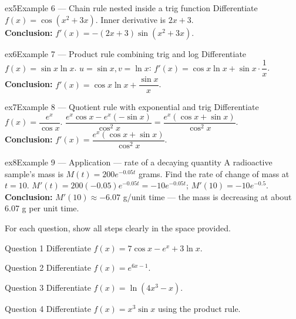 \documentclass[11pt]{article}
\begin{document}
\begin{example}{ex5}{Example 6 --- Chain rule nested inside a trig function}
Differentiate $f(x)=\cos(x^2+3x)$.\soln
Inner derivative is $2x+3$.\\[3pt]\textbf{Conclusion:} $f'(x)=-(2x+3)\sin(x^2+3x)$.
\end{example}

\begin{example}{ex6}{Example 7 --- Product rule combining trig and log}
Differentiate $f(x)=\sin x\ln x$.\soln
$u=\sin x,v=\ln x$: $f'(x)=\cos x\ln x+\sin x\cdot\dfrac1x$.\\[3pt]\textbf{Conclusion:} $f'(x)=\cos x\ln x+\dfrac{\sin x}{x}$.
\end{example}

\begin{example}{ex7}{Example 8 --- Quotient rule with exponential and trig}
Differentiate $f(x)=\dfrac{e^x}{\cos x}$.\soln
$\dfrac{e^x\cos x-e^x(-\sin x)}{\cos^2x}=\dfrac{e^x(\cos x+\sin x)}{\cos^2x}$.\\[3pt]\textbf{Conclusion:} $f'(x)=\dfrac{e^x(\cos x+\sin x)}{\cos^2x}$.
\end{example}

\begin{example}{ex8}{Example 9 --- Application --- rate of a decaying quantity}
A radioactive sample's mass is $M(t)=200e^{-0.05t}$ grams. Find the rate of change of mass at $t=10$.\soln
$M'(t)=200(-0.05)e^{-0.05t}=-10e^{-0.05t}$; $M'(10)=-10e^{-0.5}$.\\[3pt]\textbf{Conclusion:} $M'(10)\approx-6.07$ g/unit time --- the mass is decreasing at about 6.07 g per unit time.
\end{example}

\clearpage
{}
For each question, show all steps clearly in the space provided.

\begin{qbox}{Question 1}
Differentiate $f(x)=7\cos x-e^x+3\ln x$.\workspace{2.4cm}
\end{qbox}

\begin{qbox}{Question 2}
Differentiate $f(x)=e^{6x-1}$.\workspace{2.4cm}
\end{qbox}

\begin{qbox}{Question 3}
Differentiate $f(x)=\ln(4x^3-x)$.\workspace{2.4cm}
\end{qbox}

\begin{qbox}{Question 4}
Differentiate $f(x)=x^3\sin x$ using the product rule.\workspace{2.4cm}
\end{qbox}
\end{document}
